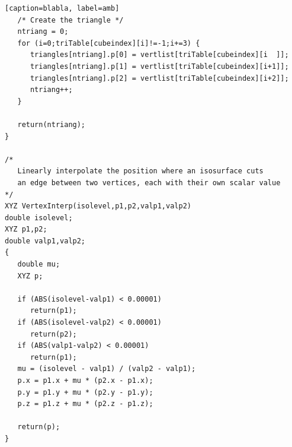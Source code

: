 \documentclass[12pt]{article}
\begin{document}
\begin{lstlisting}[frame=single][caption=blabla, label=amb]
   /* Create the triangle */
   ntriang = 0;
   for (i=0;triTable[cubeindex][i]!=-1;i+=3) {
      triangles[ntriang].p[0] = vertlist[triTable[cubeindex][i  ]];
      triangles[ntriang].p[1] = vertlist[triTable[cubeindex][i+1]];
      triangles[ntriang].p[2] = vertlist[triTable[cubeindex][i+2]];
      ntriang++;
   }

   return(ntriang);
}

/*
   Linearly interpolate the position where an isosurface cuts
   an edge between two vertices, each with their own scalar value
*/
XYZ VertexInterp(isolevel,p1,p2,valp1,valp2)
double isolevel;
XYZ p1,p2;
double valp1,valp2;
{
   double mu;
   XYZ p;

   if (ABS(isolevel-valp1) < 0.00001)
      return(p1);
   if (ABS(isolevel-valp2) < 0.00001)
      return(p2);
   if (ABS(valp1-valp2) < 0.00001)
      return(p1);
   mu = (isolevel - valp1) / (valp2 - valp1);
   p.x = p1.x + mu * (p2.x - p1.x);
   p.y = p1.y + mu * (p2.y - p1.y);
   p.z = p1.z + mu * (p2.z - p1.z);

   return(p);
}
\end{lstlisting}
\end{document}
